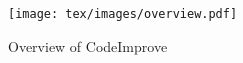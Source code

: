 


\label{design}
\begin{figure}[!htbp]
\centering
\texttt{[image: tex/images/overview.pdf]}
\caption{Overview of CodeImprove} 
\label{fig:Overview}
\end{figure}